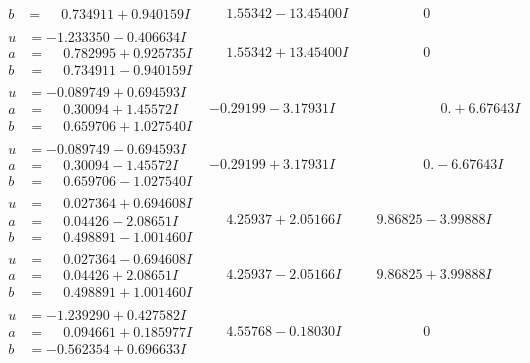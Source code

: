 \documentclass[1p]{elsarticle_modified}
\theoremstyle{definition}
\begin{document}
$$\begin{array}{c|c|c}
\begin{aligned}
b &= \phantom{-}0.734911 + 0.940159 I\end{aligned}
 & \phantom{-}1.55342 - 13.45400 I & \phantom{-0.000000 } 0 \\ \hline\begin{aligned}
u &= -1.233350 - 0.406634 I \\
a &= \phantom{-}0.782995 + 0.925735 I \\
b &= \phantom{-}0.734911 - 0.940159 I\end{aligned}
 & \phantom{-}1.55342 + 13.45400 I & \phantom{-0.000000 } 0 \\ \hline\begin{aligned}
u &= -0.089749 + 0.694593 I \\
a &= \phantom{-}0.30094 + 1.45572 I \\
b &= \phantom{-}0.659706 + 1.027540 I\end{aligned}
 & -0.29199 - 3.17931 I & \phantom{-0.000000 -}0. + 6.67643 I \\ \hline\begin{aligned}
u &= -0.089749 - 0.694593 I \\
a &= \phantom{-}0.30094 - 1.45572 I \\
b &= \phantom{-}0.659706 - 1.027540 I\end{aligned}
 & -0.29199 + 3.17931 I & \phantom{-0.000000 } 0. - 6.67643 I \\ \hline\begin{aligned}
u &= \phantom{-}0.027364 + 0.694608 I \\
a &= \phantom{-}0.04426 - 2.08651 I \\
b &= \phantom{-}0.498891 - 1.001460 I\end{aligned}
 & \phantom{-}4.25937 + 2.05166 I & \phantom{-}9.86825 - 3.99888 I \\ \hline\begin{aligned}
u &= \phantom{-}0.027364 - 0.694608 I \\
a &= \phantom{-}0.04426 + 2.08651 I \\
b &= \phantom{-}0.498891 + 1.001460 I\end{aligned}
 & \phantom{-}4.25937 - 2.05166 I & \phantom{-}9.86825 + 3.99888 I \\ \hline\begin{aligned}
u &= -1.239290 + 0.427582 I \\
a &= \phantom{-}0.094661 + 0.185977 I \\
b &= -0.562354 + 0.696633 I\end{aligned}
 & \phantom{-}4.55768 - 0.18030 I & \phantom{-0.000000 } 0 \\ \hline\begin{aligned}

\end{aligned}
\end{array}$$
\end{document}
